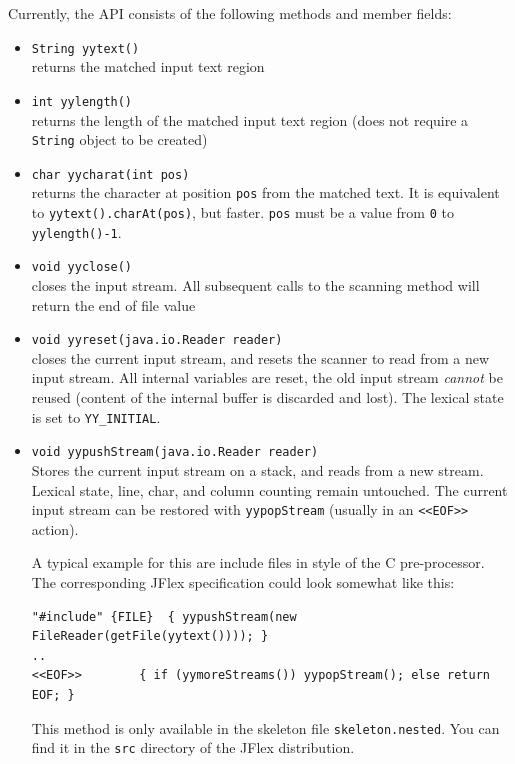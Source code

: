 \documentclass[11pt]{scrartcl}
\begin{document}
Currently, the API consists of the following methods and member fields:
\begin{itemize}
\item \texttt{String yytext()}\\
  returns the matched input text region

\item \texttt{int yylength()}\\
  returns the length of the matched input text region (does not require
  a \texttt{String} object to be created)
  
\item \texttt{char yycharat(int pos)}\\
  returns the character at position \texttt{pos} from the matched text.
  It is equivalent to \texttt{yytext().charAt(pos)}, but faster. 
  \texttt{pos} must be a value from \texttt{0} to \texttt{yylength()-1}.

\item \texttt{void yyclose()}\\
  closes the input stream. All subsequent calls to the scanning method will 
  return the end of file value    

\item \texttt{void yyreset(java.io.Reader reader)}\\
  closes the current input stream, and resets the scanner to read from
  a new input stream.  All internal variables are reset, the old input
  stream {\em cannot} be reused (content of the internal buffer is
  discarded and lost).  The lexical state is set to \texttt{YY\_INITIAL}.

\item \texttt{void yypushStream(java.io.Reader reader)}\\
 Stores the current input stream on a stack, and
 reads from a new stream. Lexical state, line,
 char, and column counting remain untouched.
 The current input stream can be restored with
 \texttt{yypopStream} (usually in an \texttt{<<EOF>>} action).
 
 A typical example for this are include files in
 style of the C pre-processor. The corresponding 
 JFlex specification could look somewhat like this:
\begin{verbatim}
"#include" {FILE}  { yypushStream(new FileReader(getFile(yytext()))); }
..
<<EOF>>        { if (yymoreStreams()) yypopStream(); else return EOF; }
\end{verbatim}

 This method is only available in the skeleton file
 \texttt{skeleton.nested}. You can find it in the 
 \texttt{src} directory of the JFlex distribution.


\end{itemize}
\end{document}
